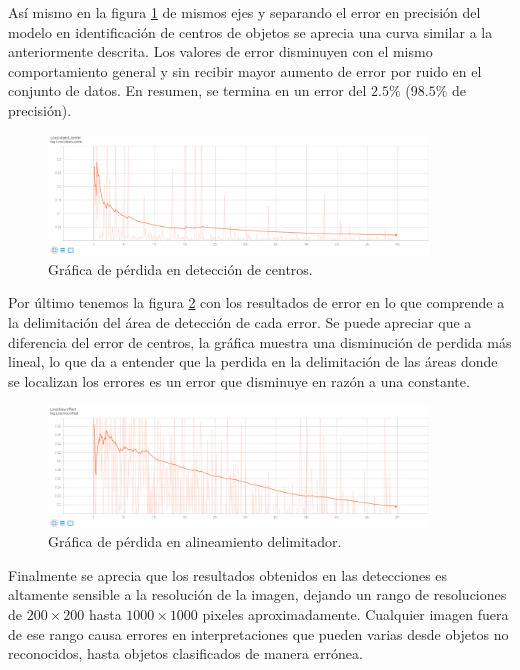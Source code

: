 \documentclass[letter,12pt]{report}
\begin{document}
Así mismo en la figura \ref{fig:object_center} de mismos ejes y separando el error en
precisión del modelo en identificación de centros de objetos se aprecia una curva similar a
la anteriormente descrita. Los valores de error disminuyen con el mismo comportamiento
general y sin recibir mayor aumento de error por ruido en el conjunto de datos. En resumen,
se termina en un error del $2.5\%$ ($98.5\%$ de precisión).

\begin{figure}[ht]
    \centering
    \includegraphics[width=0.9\textwidth]{object_center}
    \caption{Gráfica de pérdida en detección de centros.}
    \label{fig:object_center}
\end{figure}

Por último tenemos la figura \ref{fig:offset} con los resultados de error en lo que comprende
a la delimitación del área de detección de cada error. Se puede apreciar que a diferencia del
error de centros, la gráfica muestra una disminución de perdida más lineal, lo que da a 
entender que la perdida en la delimitación de las áreas donde se localizan los errores es un
error que disminuye en razón a una constante.

\begin{figure}[ht]
    \centering
    \includegraphics[width=0.9\textwidth]{offset}
    \caption{Gráfica de pérdida en alineamiento delimitador.}
    \label{fig:offset}
\end{figure}

Finalmente se aprecia que los resultados obtenidos en las detecciones es altamente sensible
a la resolución de la imagen, dejando un rango de resoluciones de $200\times200$ hasta
$1000\times1000$ pixeles aproximadamente. Cualquier imagen fuera de ese rango causa errores en
interpretaciones que pueden varias desde objetos no reconocidos, hasta objetos clasificados
de manera errónea.
\end{document}
